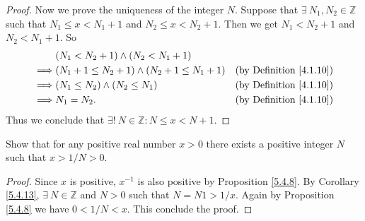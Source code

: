 \begin{proof}
Now we prove the uniqueness of the integer \(N\).
Suppose that \(\exists\ N_1, N_2 \in \mathds{Z}\) such that \(N_1 \leq x < N_1 + 1\) and \(N_2 \leq x < N_2 + 1\).
Then we get \(N_1 < N_2 + 1\) and \(N_2 < N_1 + 1\).
So
\begin{align*}
& (N_1 < N_2 + 1) \land (N_2 < N_1 + 1) \\
\implies & (N_1 + 1 \leq N_2 + 1) \land (N_2 + 1 \leq N_1 + 1) & \text{(by Definition \ref{4.1.10})} \\
\implies & (N_1 \leq N_2) \land (N_2 \leq N_1) & \text{(by Definition \ref{4.1.10})} \\
\implies & N_1 = N_2. & \text{(by Definition \ref{4.1.10})}
\end{align*}
Thus we conclude that \(\exists!\ N \in \mathds{Z} : N \leq x < N + 1\).
\end{proof}

\begin{exercise}\label{ex 5.4.4}
Show that for any positive real number \(x > 0\) there exists a positive integer \(N\) such that \(x > 1 / N > 0\).
\end{exercise}

\begin{proof}
Since \(x\) is positive, \(x^{-1}\) is also positive by Proposition \ref{5.4.8}.
By Corollary \ref{5.4.13}, \(\exists\ N \in \mathds{Z}\) and \(N > 0\) such that \(N = N1 > 1 / x\).
Again by Proposition \ref{5.4.8} we have \(0 < 1 / N < x\).
This conclude the proof.
\end{proof}
